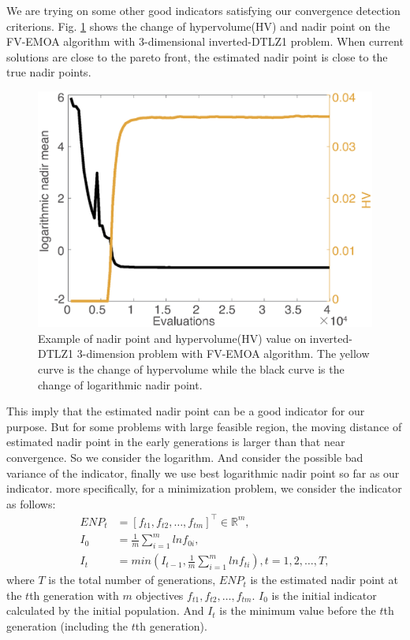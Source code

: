 \documentclass[conference]{IEEEtran}
\begin{document}
We are trying on some other good indicators satisfying our convergence detection criterions. 
Fig. \ref{wcd1} shows the change of hypervolume(HV) and nadir point on the FV-EMOA algorithm 
with 3-dimensional inverted-DTLZ1 problem.
When current solutions are close to the pareto front, the estimated nadir point is close 
to the true nadir points. 
\begin{figure}[!t]
  \centering
    \includegraphics[width=\columnwidth]{FVEMOA_IDTLZ1_M3_nadir_1}
  \caption{Example of nadir point and hypervolume(HV) value on inverted-DTLZ1 3-dimension problem
  with FV-EMOA algorithm.
  The yellow curve is the change of hypervolume 
  while the black curve is the change of logarithmic nadir point.
  }
  \label{wcd1}
\end{figure}
This imply that the estimated nadir point can be a good indicator for our purpose. 
But for some problems with large feasible region, 
the moving distance of estimated nadir point in the early generations is larger than that near convergence.
So we consider the logarithm. And consider the possible bad variance of the indicator, 
finally we use best logarithmic nadir point so far as our indicator. more specifically,
for a minimization problem, we consider the indicator as follows:
\begin{equation}\begin{aligned}\label{ewcd1}
  ENP_{t} &= [f_{t1},f_{t2},\dots,f_{tm}]^\top \in \mathbb{R}^m ,\\
  I_{0} &= \frac{1}{m} \sum_{i=1}^{m}lnf_{0i},\\
  I_{t} &= min(I_{t-1},\frac{1}{m} \sum_{i=1}^{m}lnf_{ti}),
  t = 1,2,\dots,T,
\end{aligned}
\end{equation}
where $T$ is the total number of generations, 
$ENP_{t}$ is the estimated nadir point at the $t$th generation with $m$ objectives $f_{t1},f_{t2},\dots,f_{tm}$. 
$I_0$ is the initial indicator calculated by the initial population.
And $I_t$ is the minimum value before the $t$th generation (including the $t$th generation). 
\end{document}
